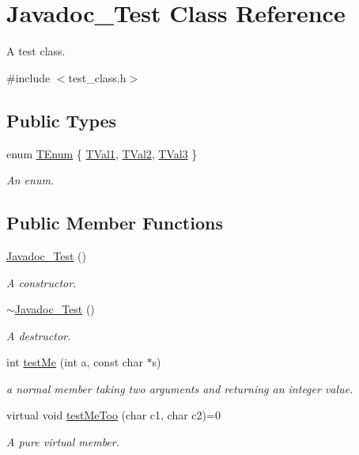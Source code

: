 \hypertarget{class_javadoc___test}{}\section{Javadoc\+\_\+\+Test Class Reference}
\label{class_javadoc___test}


A test class.  




{\ttfamily \#include $<$test\+\_\+class.\+h$>$}

\subsection*{Public Types}
\begin{DoxyCompactItemize}
\item 
enum \mbox{\hyperlink{class_javadoc___test_a33e3643b66dfa91e4fb7cc663a23e166}{T\+Enum}} \{ \mbox{\hyperlink{class_javadoc___test_a33e3643b66dfa91e4fb7cc663a23e166ac9f4289a4feb75ac0139725819c1b157}{T\+Val1}}, 
\mbox{\hyperlink{class_javadoc___test_a33e3643b66dfa91e4fb7cc663a23e166ac00c479a45ce5e7084ad3f2afdfc2fb3}{T\+Val2}}, 
\mbox{\hyperlink{class_javadoc___test_a33e3643b66dfa91e4fb7cc663a23e166a0fdf008c61e518a16a3e9ec2cc8d2c78}{T\+Val3}}
 \}
\begin{DoxyCompactList}\small\item\em An enum. \end{DoxyCompactList}\end{DoxyCompactItemize}
\subsection*{Public Member Functions}
\begin{DoxyCompactItemize}
\item 
\mbox{\hyperlink{class_javadoc___test_a7adb1076a9f698a2aa8a5ac0879f34ff}{Javadoc\+\_\+\+Test}} ()
\begin{DoxyCompactList}\small\item\em A constructor. \end{DoxyCompactList}\item 
\mbox{\hyperlink{class_javadoc___test_abda4d40f58e25104c7087e435fb0ddd0}{$\sim$\+Javadoc\+\_\+\+Test}} ()
\begin{DoxyCompactList}\small\item\em A destructor. \end{DoxyCompactList}\item 
int \mbox{\hyperlink{class_javadoc___test_af1299ea1b7efeb1548c7aba201ebe756}{test\+Me}} (int a, const char $\ast$s)
\begin{DoxyCompactList}\small\item\em a normal member taking two arguments and returning an integer value. \end{DoxyCompactList}\item 
virtual void \mbox{\hyperlink{class_javadoc___test_afe4f857536cdccd2f160ad619a61eba3}{test\+Me\+Too}} (char c1, char c2)=0
\begin{DoxyCompactList}\small\item\em A pure virtual member. \end{DoxyCompactList}\end{DoxyCompactItemize}
